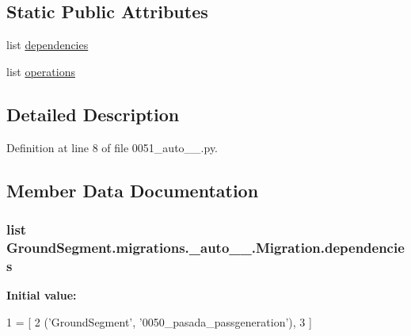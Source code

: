 \subsection*{Static Public Attributes}
\begin{DoxyCompactItemize}
\item 
list \hyperlink{class_ground_segment_1_1migrations_1_10051__auto__20170313__1436_1_1_migration_aaf44533fcb2d9b25abbed6a89e584dde}{dependencies}
\item 
list \hyperlink{class_ground_segment_1_1migrations_1_10051__auto__20170313__1436_1_1_migration_a2b9e3dabb7814738ca71bc05e4a23c67}{operations}
\end{DoxyCompactItemize}


\subsection{Detailed Description}


Definition at line 8 of file 0051\+\_\+auto\+\_\+\_.\+py.



\subsection{Member Data Documentation}
\hypertarget{class_ground_segment_1_1migrations_1_10051__auto__20170313__1436_1_1_migration_aaf44533fcb2d9b25abbed6a89e584dde}{}
\subsubsection[{dependencies}]{\setlength{\rightskip}{0pt plus 5cm}list Ground\+Segment.\+migrations.\+\_\+auto\+\_\+\_.\+Migration.\+dependencies\hspace{0.3cm}{\ttfamily [static]}}\label{class_ground_segment_1_1migrations_1_10051__auto__20170313__1436_1_1_migration_aaf44533fcb2d9b25abbed6a89e584dde}
{\bfseries Initial value\+:}
\begin{DoxyCode}
1 = [
2         (\textcolor{stringliteral}{'GroundSegment'}, \textcolor{stringliteral}{'0050\_pasada\_passgeneration'}),
3     ]
\end{DoxyCode}


